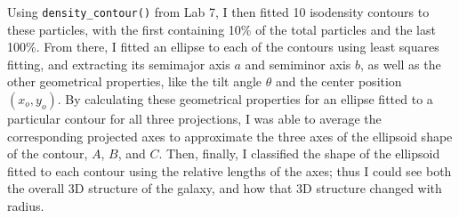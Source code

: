 \documentclass[twocolumn]{aastex631}
\begin{document}
Using \texttt{density\_contour()} from Lab 7, I then fitted 10 isodensity contours to these particles, with the first containing 10\% of the total particles and the last 100\%.
From there, I fitted an ellipse to each of the contours using least squares fitting, and extracting its semimajor axis $a$ and semiminor axis $b$, as well as the other geometrical properties, like the tilt angle $\theta$ and the center position $(x_o, y_o)$.
By calculating these geometrical properties for an ellipse fitted to a particular contour for all three projections, I was able to average the corresponding projected axes to approximate the three axes of the ellipsoid shape of the contour, $A$, $B$, and $C$.
Then, finally, I classified the shape of the ellipsoid fitted to each contour using the relative lengths of the axes; thus I could see both the overall 3D structure of the galaxy, and how that 3D structure changed with radius.
\end{document}
